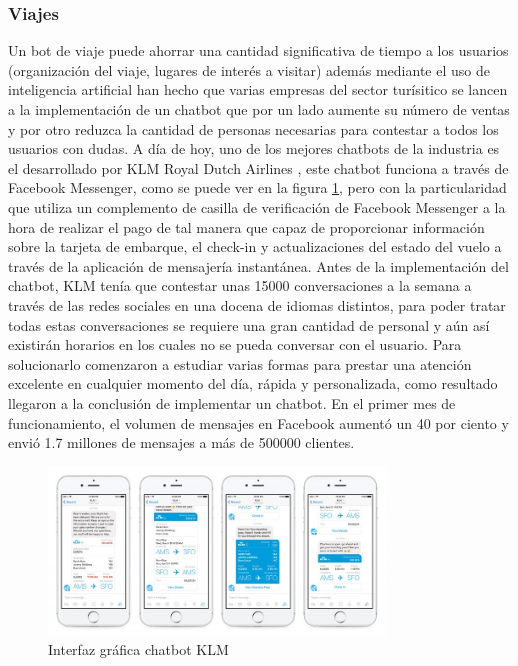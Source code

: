 \subsubsection{Viajes}
Un bot de viaje puede ahorrar una cantidad significativa de tiempo a los usuarios (organización del viaje, lugares de interés a visitar) además mediante el uso de inteligencia artificial han hecho que varias empresas del sector turísitico se lancen a la implementación de un chatbot que por un lado aumente su número de ventas y por otro reduzca la cantidad de personas necesarias para contestar a todos los usuarios con dudas.
A día de hoy, uno de los mejores chatbots de la industria es el desarrollado por KLM Royal Dutch Airlines \cite{klm}, este chatbot funciona a través de Facebook Messenger, como se puede ver en la figura \ref{fig:klm}, pero con la particularidad que utiliza un complemento de casilla de verificación de Facebook Messenger a la hora de realizar el pago de tal manera que capaz de proporcionar información sobre la tarjeta de embarque, el check-in y actualizaciones del estado del vuelo a través de la aplicación de mensajería instantánea.
Antes de la implementación del chatbot, KLM tenía que contestar unas 15000 conversaciones a la semana a través de las redes sociales en una docena de idiomas distintos, para poder tratar todas estas conversaciones se requiere una gran cantidad de personal y aún así existirán horarios en los cuales no se pueda conversar con el usuario. Para solucionarlo comenzaron a estudiar varias formas para prestar una atención excelente en cualquier momento del día, rápida y personalizada, como resultado llegaron a la conclusión de implementar un chatbot. 
En el primer mes de funcionamiento, el volumen de mensajes en Facebook aumentó un 40 por ciento y envió 1.7 millones de mensajes a más de 500000 clientes.

\begin{figure}[H]
    \centering
    \includegraphics[width=0.8\textwidth]{include/figuras/klm-chatbot.jpg}
    \caption{Interfaz gráfica chatbot KLM}
    \label{fig:klm}
\end{figure}


